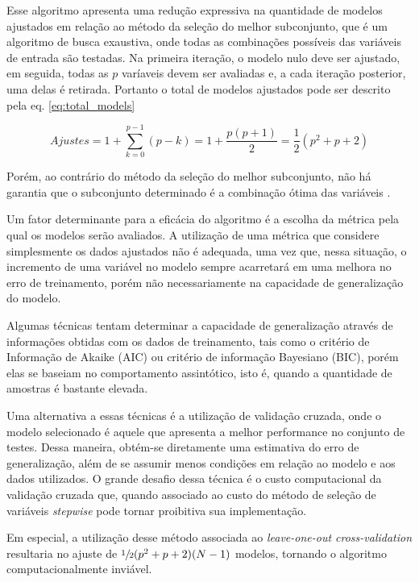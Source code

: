 \qquad

Esse algoritmo apresenta uma redução expressiva na quantidade de modelos ajustados em relação ao método da 
seleção do melhor subconjunto, que é um algoritmo de busca exaustiva, onde todas as combinações possíveis das 
variáveis de entrada são testadas. Na primeira iteração, o modelo nulo deve ser ajustado, em seguida, todas as 
$p$ varíaveis devem ser avaliadas e, a cada iteração posterior, uma delas é retirada. Portanto o total de 
modelos ajustados pode ser descrito pela eq. \ref{eq:total_models}

\begin{equation}
    Ajustes = 1 + \sum^{p-1}_{k = 0} (p-k) = 1 + \dfrac{p (p+1)}{2} =  \dfrac{1}{2} (p^2 + p  + 2)
    \label{eq:total_models}
\end{equation}

Porém, ao contrário do método da seleção do melhor subconjunto, não há garantia que o subconjunto determinado é 
a combinação ótima das variáveis \cite[p. 208]{intro_stat_learn}.

Um fator determinante para a eficácia do algoritmo é a escolha da métrica pela qual os modelos serão avaliados. A utilização de uma métrica que considere simplesmente os dados ajustados não é adequada, 
uma vez que, nessa situação, o incremento de uma variável no modelo sempre acarretará em uma melhora no erro de treinamento, porém não necessariamente na capacidade de generalização do modelo.

Algumas técnicas tentam determinar a capacidade de generalização através de informações obtidas com os dados de treinamento, tais como o critério de Informação de Akaike (AIC) ou critério de informação Bayesiano (BIC), porém elas se baseiam no comportamento assintótico, isto é, quando a quantidade de amostras é bastante elevada.

Uma alternativa a essas técnicas é a utilização de validação cruzada, onde o modelo selecionado é aquele que apresenta a melhor performance no conjunto de testes. Dessa maneira, obtém-se diretamente uma estimativa do erro de generalização, além de se assumir menos condições em relação ao modelo e aos dados utilizados. O grande desafio dessa técnica é o custo computacional da validação cruzada que, quando associado ao custo do método de seleção de variáveis \textit{stepwise} pode tornar proibitiva sua implementação.

Em especial, a utilização desse método associada ao \textit{leave-one-out cross-validation} resultaria no ajuste de $\sfrac{1}{2}(p^2+p+2)(N-1)$ modelos, tornando o algoritmo computacionalmente inviável.


